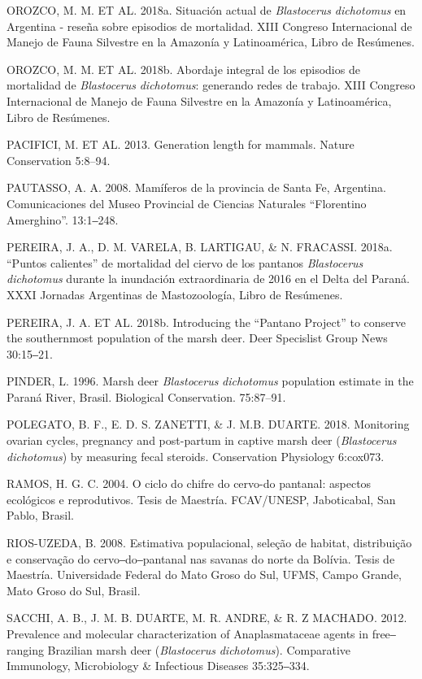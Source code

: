 \documentclass[
  x11names]{article}
\begin{document}
OROZCO, M. M. ET AL. 2018a. Situación actual de \textit{Blastocerus}
\textit{dichotomus} en Argentina - reseña sobre episodios de mortalidad.
XIII Congreso Internacional de Manejo de Fauna Silvestre en la Amazonía
y Latinoamérica, Libro de Resúmenes.

OROZCO, M. M. ET AL. 2018b. Abordaje integral de los episodios de
mortalidad de \textit{Blastocerus} \textit{dichotomus}: generando redes
de trabajo. XIII Congreso Internacional de Manejo de Fauna Silvestre en
la Amazonía y Latinoamérica, Libro de Resúmenes.

PACIFICI, M. ET AL. 2013. Generation length for mammals. Nature
Conservation 5:8--94.

PAUTASSO, A. A. 2008. Mamíferos de la provincia de Santa Fe, Argentina.
Comunicaciones del Museo Provincial de Ciencias Naturales ``Florentino
Amerghino''. 13:1‒248.

PEREIRA, J. A., D. M. VARELA, B. LARTIGAU, \& N. FRACASSI. 2018a.
``Puntos calientes'' de mortalidad del ciervo de los pantanos
\textit{Blastocerus} \textit{dichotomus} durante la inundación
extraordinaria de 2016 en el Delta del Paraná. XXXI Jornadas Argentinas
de Mastozoología, Libro de Resúmenes.

PEREIRA, J. A. ET AL. 2018b. Introducing the ``Pantano Project'' to
conserve the southernmost population of the marsh deer. Deer Specislist
Group News 30:15‒21.

PINDER, L. 1996. Marsh deer \textit{Blastocerus} \textit{dichotomus}
population estimate in the Paraná River, Brasil. Biological
Conservation. 75:87--91.

POLEGATO, B. F., E. D. S. ZANETTI, \& J. M.B. DUARTE. 2018. Monitoring
ovarian cycles, pregnancy and post-partum in captive marsh deer
(\textit{Blastocerus} \textit{dichotomus}) by measuring fecal steroids.
Conservation Physiology 6:cox073.

RAMOS, H. G. C. 2004. O ciclo do chifre do cervo-do pantanal: aspectos
ecológicos e reprodutivos. Tesis de Maestría. FCAV/UNESP, Jaboticabal,
San Pablo, Brasil.

RIOS-UZEDA, B. 2008. Estimativa populacional, seleção de habitat,
distribuição e conservação do cervo‒do‒pantanal nas savanas do norte da
Bolívia. Tesis de Maestría. Universidade Federal do Mato Groso do Sul,
UFMS, Campo Grande, Mato Groso do Sul, Brasil.

SACCHI, A. B., J. M. B. DUARTE, M. R. ANDRE, \& R. Z MACHADO. 2012.
Prevalence and molecular characterization of Anaplasmataceae agents in
free‒ranging Brazilian marsh deer (\textit{Blastocerus}
\textit{dichotomus}). Comparative Immunology, Microbiology \& Infectious
Diseases 35:325‒334.
\end{document}
